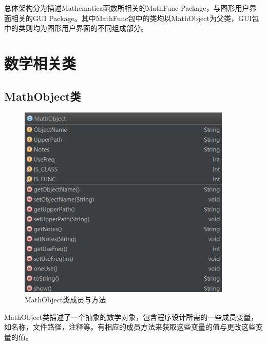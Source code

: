 \documentclass[hyperref, UTF8
,bookmarksnumbered=true, oneside]{ctexbook}
\begin{document}
		总体架构分为描述Mathematica函数所相关的MathFunc Package，与图形用户界面相关的GUI Package。其中MathFunc包中的类均以MathObject为父类，GUI包中的类则均为图形用户界面的不同组成部分。


		


	\section{数学相关类} %

		\subsection{MathObject类} %
		\label{sub:mathobject}

			\begin{figure}[!h]
				\centering
				\includegraphics[width=4in]{MathObject.png}
				\caption{MathObject类成员与方法}	
				\label{pic:MathObject}
			\end{figure}

			MathObject类描述了一个抽象的数学对象，包含程序设计所需的一些成员变量，如名称，文件路径，注释等。有相应的成员方法来获取这些变量的值与更改这些变量的值。

\end{document}
